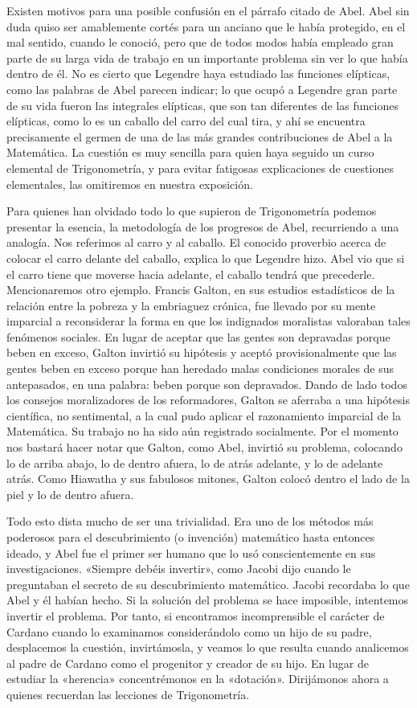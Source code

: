 \documentclass[a4paper, 12pt, draft]{article}
\begin{document}
Existen motivos para una posible confusión en el párrafo citado de Abel. Abel sin duda quiso ser amablemente cortés para un anciano que le había protegido, en el mal sentido, cuando le conoció, pero que de todos modos había empleado gran parte de su larga vida de trabajo en un importante problema sin ver lo que había dentro de él. No es cierto que Legendre haya estudiado las funciones elípticas, como las palabras de Abel parecen indicar; lo que ocupó a Legendre gran parte de su vida fueron las integrales elípticas, que son tan diferentes de las funciones elípticas, como lo es un caballo del carro del cual tira, y ahí se encuentra precisamente el germen de una de las más grandes contribuciones de Abel a la Matemática. La cuestión es muy sencilla para quien haya seguido un curso elemental de Trigonometría, y para evitar fatigosas explicaciones de cuestiones elementales, las omitiremos en nuestra exposición.

Para quienes han olvidado todo lo que supieron de Trigonometría podemos presentar la esencia, la metodología de los progresos de Abel, recurriendo a una analogía. Nos referimos al carro y al caballo. El conocido proverbio acerca de colocar el carro delante del caballo, explica lo que Legendre hizo. Abel vio que si el carro tiene que moverse hacia adelante, el caballo tendrá que precederle. Mencionaremos otro ejemplo. Francis Galton, en sus estudios estadísticos de la relación entre la pobreza y la embriaguez crónica, fue llevado por su mente imparcial a reconsiderar la forma en que los indignados moralistas valoraban tales fenómenos sociales. En lugar de aceptar que las gentes son depravadas porque beben en exceso, Galton invirtió su hipótesis y aceptó provisionalmente que las gentes beben en exceso porque han heredado malas condiciones morales de sus antepasados, en una palabra: beben porque son depravados. Dando de lado todos los consejos moralizadores de los reformadores, Galton se aferraba a una hipótesis científica, no sentimental, a la cual pudo aplicar el razonamiento imparcial de la Matemática. Su trabajo no ha sido aún registrado socialmente. Por el momento nos bastará hacer notar que Galton, como Abel, invirtió su problema, colocando lo de arriba abajo, lo de dentro afuera, lo de atrás adelante, y lo de adelante atrás. Como Hiawatha y sus fabulosos mitones, Galton colocó dentro el lado de la piel y lo de dentro afuera.

Todo esto dista mucho de ser una trivialidad. Era uno de los métodos más poderosos para el descubrimiento (o invención) matemático hasta entonces ideado, y Abel fue el primer ser humano que lo usó conscientemente en sus investigaciones. «Siempre debéis invertir», como Jacobi dijo cuando le preguntaban el secreto de su descubrimiento matemático. Jacobi recordaba lo que Abel y él habían hecho. Si la solución del problema se hace imposible, intentemos invertir el problema. Por tanto, si encontramos incomprensible el carácter de Cardano cuando lo examinamos considerándolo como un hijo de su padre, desplacemos la cuestión, invirtámosla, y veamos lo que resulta cuando analicemos al padre de Cardano como el progenitor y creador de su hijo. En lugar de estudiar la «herencia» concentrémonos en la «dotación». Dirijámonos ahora a quienes recuerdan las lecciones de Trigonometría.
\end{document}
